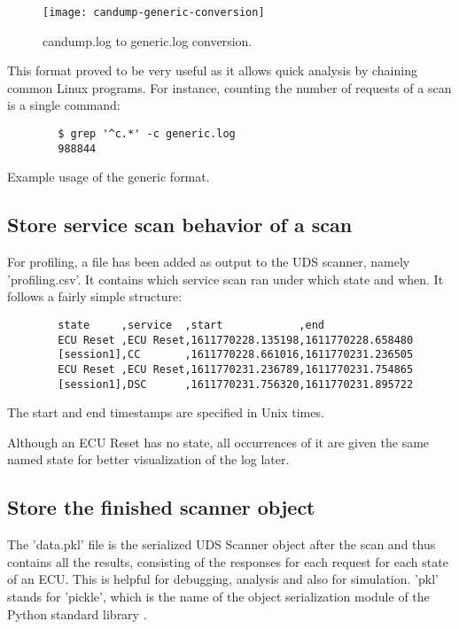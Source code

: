 \begin{figure}[htb]
    \centering
    \texttt{[image: candump-generic-conversion]}
    \caption{candump.log to generic.log conversion.}
    \label{fig:candump-generic-conversion}
\end{figure}

This format proved to be very useful as it allows quick analysis by chaining common Linux programs.
For instance, counting the number of requests of a scan is a single command:
\begin{listing}[H]
\begin{verbatim}
        $ grep '^c.*' -c generic.log
        988844
\end{verbatim}
\caption{Example usage of the generic format.}
\label{lst:usage-generic}
\end{listing}

\subsection{Store service scan behavior of a scan}

For profiling, a file has been added as output to the UDS scanner, namely 'profiling.csv'.
It contains which service scan ran under which state and when. It follows a fairly simple structure:

\begin{samepage}
    \begin{verbatim}
        state     ,service  ,start            ,end
        ECU Reset ,ECU Reset,1611770228.135198,1611770228.658480
        [session1],CC       ,1611770228.661016,1611770231.236505
        ECU Reset ,ECU Reset,1611770231.236789,1611770231.754865
        [session1],DSC      ,1611770231.756320,1611770231.895722
    \end{verbatim}
\end{samepage}

The start and end timestamps are specified in Unix times.

Although an ECU Reset has no state, all occurrences of it are given the same named state for better visualization of the log later.

\subsection{Store the finished scanner object}

The 'data.pkl' file is the serialized UDS Scanner object after the scan and thus contains all the results, consisting of the responses for each request for each state of an ECU. 
This is helpful for debugging, analysis and also for simulation. 'pkl' stands for 'pickle', which is the name of the object serialization module of the Python standard library \cite{pickle}. 


